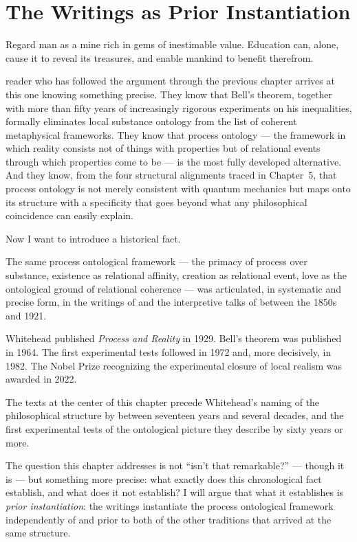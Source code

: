 \chapter{The Writings as Prior Instantiation}
\label{ch:bahai-prior}

\epigraph{Regard man as a mine rich in gems of inestimable value. Education can, alone, cause it to reveal its treasures, and enable mankind to benefit therefrom.}{\Bahaullah}

 reader who has followed the argument through the previous chapter arrives at
this one knowing something precise.
They know that Bell's theorem, together with more than fifty years of increasingly
rigorous experiments on his inequalities, formally eliminates local substance
ontology from the list of coherent metaphysical frameworks.
They know that process ontology --- the framework in which reality consists not
of things with properties but of relational events through which properties come
to be --- is the most fully developed alternative.
And they know, from the four structural alignments traced in Chapter~5, that
process ontology is not merely consistent with quantum mechanics but maps onto
its structure with a specificity that goes beyond what any philosophical
coincidence can easily explain.

Now I want to introduce a historical fact.

The same process ontological framework --- the primacy of process over substance,
existence as relational affinity, creation as relational event, love as the
ontological ground of relational coherence --- was articulated, in systematic
and precise form, in the writings of \Bahaullah and the interpretive talks of
\AbdulBaha between the 1850s and 1921.

Whitehead published \textit{Process and Reality} in 1929.
Bell's theorem was published in 1964.
The first experimental tests followed in 1972 and, more decisively, in 1982.
The Nobel Prize recognizing the experimental closure of local realism was awarded
in 2022.

The texts at the center of this chapter precede Whitehead's naming of the
philosophical structure by between seventeen years and several decades, and the
first experimental tests of the ontological picture they describe by sixty years
or more.

The question this chapter addresses is not ``isn't that remarkable?'' --- though
it is --- but something more precise: what exactly does this chronological fact
establish, and what does it not establish?
I will argue that what it establishes is \emph{prior instantiation}: the \bahai
writings instantiate the process ontological framework independently of and prior
to both of the other traditions that arrived at the same structure.

